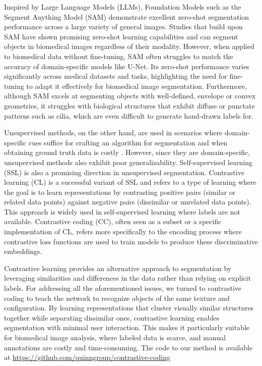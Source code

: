\documentclass[./dissertation.tex]{subfiles}
\begin{document}
\label{SAM}
Inspired by Large Language Models (LLMs), Foundation Models such as the Segment Anything Model (SAM) \cite{kirillov2023segment} demonstrate excellent zero-shot segmentation performance across a large variety of general images. Studies that build upon SAM \cite{kim2024medivistamedicalvideosegmentation} have shown promising zero-shot learning capabilities and can segment objects in biomedical images regardless of their modality. However, when applied to biomedical data without fine-tuning, SAM often struggles to match the accuracy of domain-specific models like U-Net. Its zero-shot performance varies significantly across medical datasets and tasks, highlighting the need for fine-tuning to adapt it effectively for biomedical image segmentation. Furthermore, although SAM excels at segmenting objects with well-defined, envelope or convex geometries, it struggles with biological structures that exhibit diffuse or punctate patterns such as cilia, which are even difficult to generate hand-drawn labels for.

\label{Unsupervised}
Unsupervised methods, on the other hand, are used in scenarios where domain-specific cues suffice for crafting an algorithm for segmentation and when obtaining ground truth data is costly \cite{vaezi2024training}. However, since they are domain-specific, unsupervised methods also exhibit poor generalizability. Self-supervised learning (SSL) is also a promising direction in unsupervised segmentation. Contrastive learning (CL) is a successful variant of SSL and refers to a type of learning where the goal is to learn representations by contrasting positive pairs (similar or related data points) against negative pairs (dissimilar or unrelated data points). This approach is widely used in self-supervised learning where labels are not available. Contrastive coding (CC), often seen as a subset or a specific implementation of CL, refers more specifically to the encoding process where contrastive loss functions are used to train models to produce these discriminative embeddings.

\label{Contrastive}
Contrastive learning provides an alternative approach to segmentation by leveraging similarities and differences in the data rather than relying on explicit labels. For addressing all the aforementioned issues, we turned to contrastive coding to teach the network to recognize objects of the same texture and configuration. By learning representations that cluster visually similar structures together while separating dissimilar ones, contrastive learning enables segmentation with minimal user interaction. This makes it particularly suitable for biomedical image analysis, where labeled data is scarce, and manual annotations are costly and time-consuming. The code to our method is available at \url{https://github.com/quinngroup/contrastive-coding}
\end{document}
